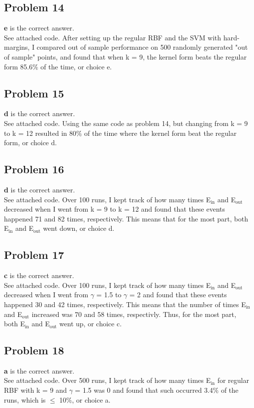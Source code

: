 \documentclass[12 pt]{article}
\begin{document}
	\subsection*{Problem 14}
	\textbf{e} is the correct answer. \\
	See attached code. After setting up the regular RBF and the SVM with hard-margins, I compared out of sample performance on 500 randomly generated "out of sample" points, and found that when k = 9, the kernel form beats the regular form 85.6$\%$ of the time, or choice e.
	
	\subsection*{Problem 15}
	\textbf{d} is the correct answer. \\
	See attached code. Using the same code as problem 14, but changing from k = 9 to k = 12 resulted in 80$\%$ of the time where the kernel form beat the regular form, or choice d.
	
	\subsection*{Problem 16}
	\textbf{d} is the correct answer. \\
	See attached code. Over 100 runs, I kept track of how many times E$_\text{in}$ and E$_\text{out}$ decreased when I went from k = 9 to k = 12 and found that these events happened 71 and 82 times, respectively. This means that for the most part, both E$_\text{in}$ and E$_\text{out}$ went down, or choice d.

	\subsection*{Problem 17}
	\textbf{c} is the correct answer. \\
	See attached code. Over 100 runs, I kept track of how many times E$_\text{in}$ and E$_\text{out}$ decreased when I went from $\gamma$ = 1.5 to $\gamma$ = 2 and found that these events happened 30 and 42 times, respectively. This means that the number of times E$_\text{in}$ and E$_\text{out}$ increased was 70 and 58 times, respectivly. Thus, for the most part, both E$_\text{in}$ and E$_\text{out}$ went up, or choice c.
	
	\subsection*{Problem 18}
	\textbf{a} is the correct answer. \\
	See attached code. Over 500 runs, I kept track of how many times E$_\text{in}$ for regular RBF with k = 9 and $\gamma$ = 1.5 was 0 and found that such occurred 3.4$\%$ of the runs, which is $\leq$ 10$\%$, or choice a.
	
\end{document}
